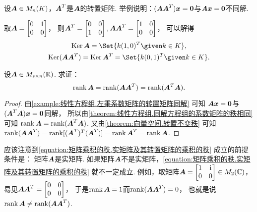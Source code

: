 \begin{example}
设\(\boldsymbol{A} \in M_n(K)\)，\(\boldsymbol{A}^T\)是\(\boldsymbol{A}\)的转置矩阵.
举例说明：\((\boldsymbol{A}\boldsymbol{A}^T)\boldsymbol{x}=\boldsymbol0\)与\(\boldsymbol{A} \boldsymbol{x} = \boldsymbol0\)不同解.
\begin{solution}
取\(\boldsymbol{A} = \begin{bmatrix}
	0 & 1 \\
	0 & 0
\end{bmatrix}\)，
则\(\boldsymbol{A}^T = \begin{bmatrix}
	0 & 0 \\
	1 & 0
\end{bmatrix},
\boldsymbol{A} \boldsymbol{A}^T = \begin{bmatrix}
	1 & 0 \\
	0 & 0
\end{bmatrix}\)，
可以解得\begin{gather*}
	\Ker\vb{A} = \Set{ k (1,0)^T \given k \in K }, \\
	\Ker(\vb{A} \vb{A}^T) = \Ker\vb{A}^T = \Set{ k (0,1)^T \given k \in K }.
\end{gather*}
\end{solution}
\end{example}
\begin{example}
设\(\boldsymbol{A} \in M_{s \times n}(\mathbb{R})\).
求证：\begin{equation}\label{equation:矩阵乘积的秩.实矩阵及其转置矩阵的乘积的秩}
	\rank\boldsymbol{A} = \rank(\boldsymbol{A} \boldsymbol{A}^T) = \rank(\boldsymbol{A}^T \boldsymbol{A}).
\end{equation}
\begin{proof}
由\cref{example:线性方程组.左乘系数矩阵的转置矩阵同解} 可知
\(\boldsymbol{A} \boldsymbol{x} = \boldsymbol0\)与\((\boldsymbol{A}^T \boldsymbol{A}) \boldsymbol{x} = \boldsymbol0\)同解，
所以由\cref{theorem:线性方程组.同解方程组的系数矩阵的秩相同} 可知
\(\rank\boldsymbol{A} = \rank(\boldsymbol{A}^T \boldsymbol{A})\).
又由\cref{theorem:向量空间.转置不变秩} 可知
\(\rank(\boldsymbol{A} \boldsymbol{A}^T)
= \rank[(\boldsymbol{A}^T)^T (\boldsymbol{A}^T)]
= \rank\boldsymbol{A}^T
= \rank\boldsymbol{A}\).
\end{proof}
\end{example}
\begin{remark}
应该注意到\cref{equation:矩阵乘积的秩.实矩阵及其转置矩阵的乘积的秩} 成立的前提条件是：
矩阵\(\boldsymbol{A}\)是实矩阵.
如果矩阵\(\boldsymbol{A}\)不是实矩阵，\cref{equation:矩阵乘积的秩.实矩阵及其转置矩阵的乘积的秩} 就不一定成立.
例如，取矩阵\(\boldsymbol{A} = \begin{bmatrix}
	1 & \kern1pt\mathrm{i}\kern1pt \\
	0 & 0
\end{bmatrix}
\in M_2(\mathbb{C})\)，
易见\(\boldsymbol{A} \boldsymbol{A}^T = \begin{bmatrix}
	0 & 0 \\
	0 & 0
\end{bmatrix}\)，
于是\(\rank\boldsymbol{A}=1\)而\(\rank(\boldsymbol{A}\boldsymbol{A}^T)=0\)，
也就是说\(\rank\boldsymbol{A}\neq\rank(\boldsymbol{A}\boldsymbol{A}^T)\).
\end{remark}
